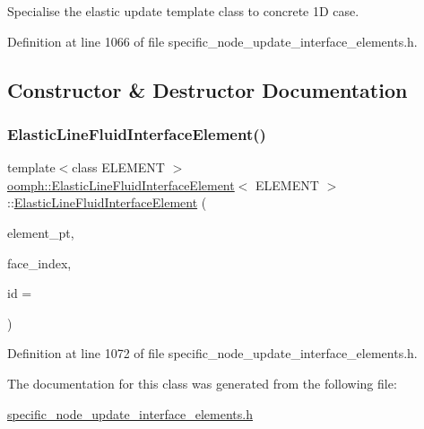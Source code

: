 Specialise the elastic update template class to concrete 1D case. 

Definition at line 1066 of file specific\+\_\+node\+\_\+update\+\_\+interface\+\_\+elements.\+h.



\subsection{Constructor \& Destructor Documentation}
\mbox{\label{classoomph_1_1ElasticLineFluidInterfaceElement_ab0dde23477404e1c97956e40cfe361ab}} 
\subsubsection{\texorpdfstring{Elastic\+Line\+Fluid\+Interface\+Element()}{ElasticLineFluidInterfaceElement()}}
{\footnotesize\ttfamily template$<$class E\+L\+E\+M\+E\+NT $>$ \\
\hyperlink{classoomph_1_1ElasticLineFluidInterfaceElement}{oomph\+::\+Elastic\+Line\+Fluid\+Interface\+Element}$<$ E\+L\+E\+M\+E\+NT $>$\+::\hyperlink{classoomph_1_1ElasticLineFluidInterfaceElement}{Elastic\+Line\+Fluid\+Interface\+Element} (\begin{DoxyParamCaption}\item[{Finite\+Element $\ast$const \&}]{element\+\_\+pt,  }\item[{const int \&}]{face\+\_\+index,  }\item[{const unsigned \&}]{id = {} }\end{DoxyParamCaption})\hspace{0.3cm}{\ttfamily [inline]}}



Definition at line 1072 of file specific\+\_\+node\+\_\+update\+\_\+interface\+\_\+elements.\+h.



The documentation for this class was generated from the following file\+:\begin{DoxyCompactItemize}
\item 
\hyperlink{specific__node__update__interface__elements_8h}{specific\+\_\+node\+\_\+update\+\_\+interface\+\_\+elements.\+h}\end{DoxyCompactItemize}
